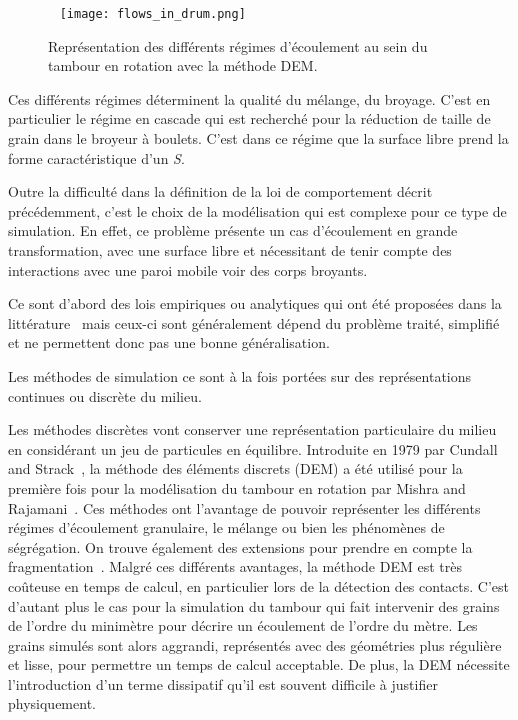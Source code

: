 \begin{figure}~\label{fig:flow_drum}
    \texttt{[image: flows\_in\_drum.png]}
    \caption{Représentation des différents régimes d'écoulement au sein du tambour en rotation avec la méthode DEM.}
\end{figure}

Ces différents régimes déterminent la qualité du mélange, du broyage. C'est en particulier le régime en cascade qui est recherché pour la réduction de taille de grain dans le broyeur à boulets. C'est dans ce régime que la surface libre prend la forme caractéristique d'un \textit{S}.

Outre la difficulté dans la définition de la loi de comportement décrit précédemment, c'est le choix de la modélisation qui est complexe pour ce type de simulation. En effet, ce problème présente un cas d'écoulement en grande transformation, avec une surface libre et nécessitant de tenir compte des interactions avec une paroi mobile voir des corps broyants.

Ce sont d'abord des lois empiriques ou analytiques qui ont été proposées dans la littérature~\cite{Ding2001,Boateng1998,Nicholas2001} mais ceux-ci sont généralement dépend du problème traité, simplifié et ne permettent donc pas une bonne généralisation.

Les méthodes de simulation ce sont à la fois portées sur des représentations continues ou discrète du milieu.

Les méthodes discrètes vont conserver une représentation particulaire du milieu en considérant un jeu de particules en équilibre. Introduite en 1979 par Cundall and Strack~\cite{cundall_discrete_1979}, la méthode des éléments discrets (DEM) a été utilisé pour la première fois pour la modélisation du tambour en rotation par Mishra and Rajamani~\cite{Mishra1992}. Ces méthodes ont l'avantage de pouvoir représenter les différents régimes d'écoulement granulaire, le mélange ou bien les phénomènes de ségrégation. On trouve également des extensions pour prendre en compte la fragmentation~\cite{orozco:hal-02409236}. Malgré ces différents avantages, la méthode DEM est très coûteuse en temps de calcul, en particulier lors de la détection des contacts. C'est d'autant plus le cas pour la simulation du tambour qui fait intervenir des grains de l'ordre du minimètre pour décrire un écoulement de l'ordre du mètre. Les grains simulés sont alors aggrandi, représentés avec des géométries plus régulière et lisse, pour permettre un temps de calcul acceptable.
De plus, la DEM nécessite l'introduction d'un terme dissipatif qu'il est souvent difficile à justifier physiquement.

